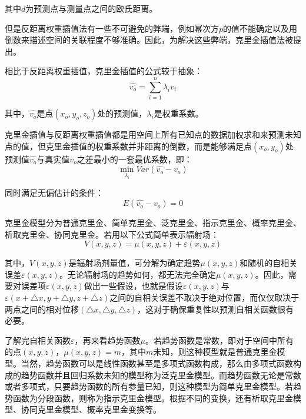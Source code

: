 \documentclass{article}
\begin{document}
其中$ d $为预测点与测量点之间的欧氏距离。

但是反距离权重插值法有一些不可避免的弊端，例如幂次方$ p $的值不能确定以及用倒数来描述空间的关联程度不够准确。因此，为解决这些弊端，克里金插值法被提出。

相比于反距离权重插值，克里金插值的公式较于抽象：
\begin{equation}
    \hat{v_{o}} = \sum_{i=1}^{n}\lambda_{i}v_{i}
\end{equation}

其中，$ \hat{v_{o}} $是点$ (x_{o},y_{o},z_{o}) $处的预测值，$ \lambda_{i} $是权重系数。

克里金插值与反距离权重插值都是用空间上所有已知点的数据加权求和来预测未知点的值，但克里金插值的权重系数并非距离的倒数，而是能够满足点$ (x_{o},y_{o}) $处预测值$ \hat{v_{o}} $与真实值$ v_{o} $之差最小的一套最优系数，即：
\begin{equation*}
    \min_{\lambda_{i}} Var \left( \hat{v_{o}} - v_{o} \right)
\end{equation*}

同时满足无偏估计的条件：
\begin{equation*}
    E\left( \hat{v_{o}} - v_{o} \right) = 0
\end{equation*}

克里金模型分为普通克里金、简单克里金、泛克里金、指示克里金、概率克里金、析取克里金、协同克里金。若用以下公式简单表示辐射场：
\begin{equation}
    V(x,y,z) = \mu(x,y,z) + \varepsilon(x,y,z)
\end{equation}

其中，$ V(x,y,z) $是辐射场剂量值，可分解为确定趋势$ \mu(x,y,z) $和随机的自相关误差$ \varepsilon(x,y,z) $。无论辐射场的趋势如何，都无法完全确定$\mu(x,y,z)$。因此，需要对误差项$ \varepsilon(x,y,z) $做出一些假设，也就是假设$ \varepsilon(x,y,z) $与$ \varepsilon(x+\triangle x,y+\triangle y,z+\triangle z) $之间的自相关误差不取决于绝对位置，而仅仅取决于两点之间的相对位移$ (\triangle x,\triangle y,\triangle z) $，这对于确保重复性以预测自相关函数很有必要。

了解完自相关函数$ \varepsilon $，再来看趋势函数$ \mu $。若趋势函数是常数，即对于空间中所有的点$ (x,y,z) $，$ \mu(x,y,z) = m $，其中$ m $未知，则这种模型就是普通克里金模型。当然，趋势函数可以是线性函数甚至是多项式函数构成，那么由多项式函数构成的趋势函数并且回归系数未知的模型称为泛克里金模型。而趋势函数无论是常数或者多项式，只要趋势函数的所有参量已知，则这种模型为简单克里金模型。若趋势函数为分段函数，则称为指示克里金模型。根据不同的变换，还有析取克里金模型、协同克里金模型、概率克里金变换等。
\end{document}
